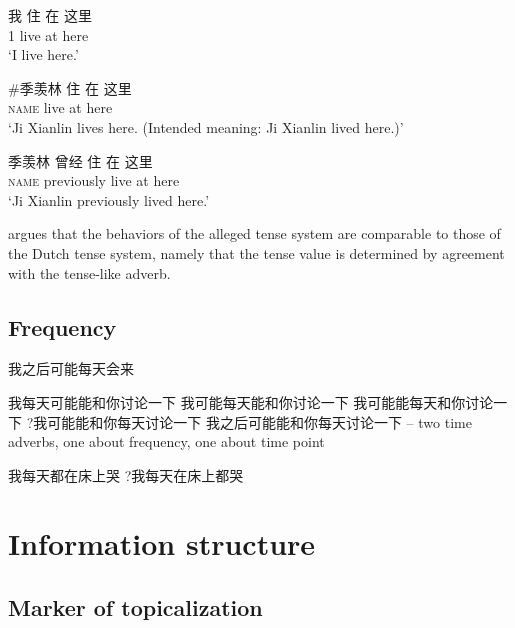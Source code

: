 \documentclass[UTF8, a4paper, oneside, scheme=plain, 12pt]{ctexrep}
\newcommand{\translate}[1]{`#1'}
\newcommand*{\category}[1]{\textsc{#1}}
\begin{document}
\begin{exe}
    \ex\label{ex:tame.tense.interpretation.1} 
    \gll 我 住 在 这里 \\
    1 live at here \\
    \glt\translate{I live here.}

    \ex\label{ex:tame.tense.interpretation.2} 
    \begin{xlist}
        \ex\label{ex:tame.tense.interpretation.2.1} 
        \gll \#季羡林 住 在 这里  \\
        \category{name} live at here \\
        \glt\translate{Ji Xianlin lives here. (Intended meaning: Ji Xianlin lived here.)}

        \ex\label{ex:tame.tense.interpretation.2.2} 
        \gll 季羡林 曾经 住 在 这里  \\
        \category{name} previously live at here \\
        \glt\translate{Ji Xianlin previously lived here.}
    \end{xlist}
\end{exe}

\citet{sybesma2007whether} argues that the behaviors of the alleged tense system
are comparable to those of the Dutch tense system,
namely that the tense value is determined by agreement with the tense-like adverb.

\section{Frequency}

\begin{exe}
    \ex 我之后可能每天会来 

    \ex *我每天可能能和你讨论一下
    \ex 我可能每天能和你讨论一下 
    \ex 我可能能每天和你讨论一下 
    \ex ?我可能能和你每天讨论一下
    \ex 我之后可能能和你每天讨论一下 -- two time adverbs, one about frequency, one about time point 
\end{exe}

\begin{exe}
    \ex 我每天都在床上哭
    \ex ?我每天在床上都哭
\end{exe}

\chapter{Information structure}

\section{Marker of topicalization}
\end{document}

